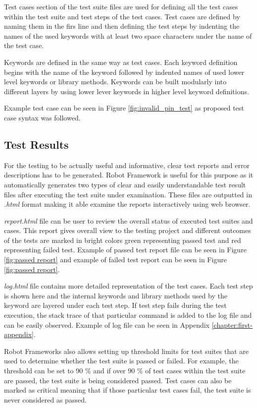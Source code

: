 Test cases section of the test suite files are used for defining all the test cases within the test suite and test steps of the test cases. Test cases are defined by naming them in the firs line and then defining the test steps by indenting the names of the used keywords with at least two space characters under the name of the test case.
    
Keywords are defined in the same way as test cases. Each keyword definition begins with the name of the keyword followed by indented names of used lower level keywords or library methods. Keywords can be built modularly into different layers by using lower lever keywords in higher level keyword definitions.

Example test case can be seen in Figure \ref{fig:invalid_pin_test} as proposed test case syntax was followed.

\subsection{Test Results}
\label{subsection:Test result syntax}

For the testing to be actually useful and informative, clear test reports and error descriptions has to be generated. Robot Framework is useful for this purpose as it automatically generates two types of clear and easily understandable test result files after executing the test suite under examination. These files are outputted in \emph{.html} format making it able examine the reports interactively using web browser.

\emph{report.html} file can be user to review the overall status of executed test suites and cases. This report gives overall view to the testing project and different outcomes of the tests are marked in bright colors green representing passed test and red representing failed test. Example of passed test report file can be seen in Figure \ref{fig:passed report} and example of failed test report can be seen in Figure \ref{fig:passed report}.

\emph{log.html} file contains more detailed representation of the test cases. Each test step is shown here and the internal keywords and library methods used by the keyword are layered under each test step. If test step fails during the test execution, the stack trace of that particular command is added to the log file and can be easily observed. Example of log file can be seen in Appendix \ref{chapter:first-appendix}.

Robot Frameworks also allows setting up threshold limits for test suites that are used to determine whether the test suite is passed or failed. For example, the threshold can be set to 90 \% and if over 90 \% of test cases within the test suite are passed, the test suite is being considered passed. Test cases can also be marked as critical meaning that if those particular test cases fail, the test suite is never considered as passed.


